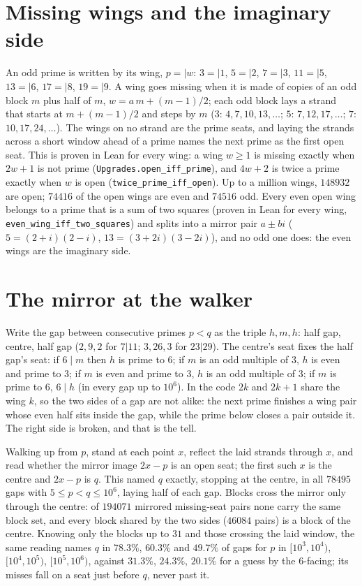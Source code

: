 \documentclass[11pt]{article}
\begin{document}
\section{Missing wings and the imaginary side}
An odd prime is written by its wing, $p = |w$: $3 = |1$, $5 = |2$, $7 = |3$, $11 = |5$, $13 = |6$, $17 = |8$, $19 = |9$. A wing goes missing when it is made of copies of an odd block $m$ plus half of $m$, $w = a\,m + (m-1)/2$; each odd block lays a strand that starts at $m + (m-1)/2$ and steps by $m$ ($3$: $4,7,10,13,\dots$; $5$: $7,12,17,\dots$; $7$: $10,17,24,\dots$). The wings on no strand are the prime seats, and laying the strands across a short window ahead of a prime names the next prime as the first open seat. This is proven in Lean for every wing: a wing $w\ge1$ is missing exactly when $2w+1$ is not prime (\texttt{Upgrades.open\_iff\_prime}), and $4w+2$ is twice a prime exactly when $w$ is open (\texttt{twice\_prime\_iff\_open}). Up to a million wings, $148932$ are open; $74416$ of the open wings are even and $74516$ odd. Every even open wing belongs to a prime that is a sum of two squares (proven in Lean for every wing, \texttt{even\_wing\_iff\_two\_squares}) and splits into a mirror pair $a\pm bi$ ($5 = (2+i)(2-i)$, $13 = (3+2i)(3-2i)$), and no odd one does: the even wings are the imaginary side.

\section{The mirror at the walker}
Write the gap between consecutive primes $p < q$ as the triple $h,m,h$: half gap, centre, half gap ($2,9,2$ for $7|11$; $3,26,3$ for $23|29$). The centre's seat fixes the half gap's seat: if $6\mid m$ then $h$ is prime to $6$; if $m$ is an odd multiple of $3$, $h$ is even and prime to $3$; if $m$ is even and prime to $3$, $h$ is an odd multiple of $3$; if $m$ is prime to $6$, $6\mid h$ (in every gap up to $10^6$). In the code $2k$ and $2k+1$ share the wing $k$, so the two sides of a gap are not alike: the next prime finishes a wing pair whose even half sits inside the gap, while the prime below closes a pair outside it. The right side is broken, and that is the tell.

Walking up from $p$, stand at each point $x$, reflect the laid strands through $x$, and read whether the mirror image $2x-p$ is an open seat; the first such $x$ is the centre and $2x-p$ is $q$. This named $q$ exactly, stopping at the centre, in all $78495$ gaps with $5\le p<q\le10^6$, laying half of each gap. Blocks cross the mirror only through the centre: of $194071$ mirrored missing-seat pairs none carry the same block set, and every block shared by the two sides ($46084$ pairs) is a block of the centre. Knowing only the blocks up to $31$ and those crossing the laid window, the same reading names $q$ in $78.3\%$, $60.3\%$ and $49.7\%$ of gaps for $p$ in $[10^3,10^4)$, $[10^4,10^5)$, $[10^5,10^6)$, against $31.3\%$, $24.3\%$, $20.1\%$ for a guess by the $6$-facing; its misses fall on a seat just before $q$, never past it.
\end{document}
